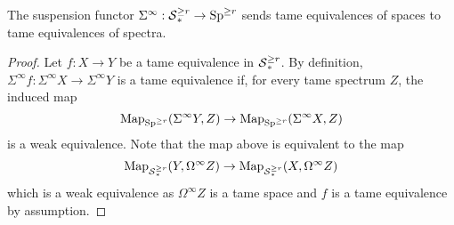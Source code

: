 \begin{lemma}
\label{Suspension preserves tame equivalence}
	The suspension functor $\Sigma^{\infty}:\operatorname{\mathcal{S}}^{\geq r}_{*} \to \operatorname{Sp}^{\geq r}$ sends tame equivalences of spaces to tame equivalences of spectra.
\end{lemma}
\begin{proof}
	Let $f:X\to Y$ be a tame equivalence in $\operatorname{\mathcal{S}}^{\geq r}_{*}$. By definition, $\Sigma^{\infty}f: \Sigma^{\infty}X \to \Sigma^{\infty}Y$ is a tame equivalence if, for every tame spectrum $Z$, the induced map
	$$
	\operatorname{Map}_{\operatorname{Sp}^{\geq r}}(\Sigma^{\infty} Y, Z) \to 	\operatorname{Map}_{\operatorname{Sp}^{\geq r}}(\Sigma^{\infty} X, Z)
	$$
	is a weak equivalence. Note that the map above is equivalent to the map
	$$
	\operatorname{Map}_{\operatorname{\mathcal{S}}^{\geq r}_{*}}(Y, \Omega^{\infty} Z) \to 	\operatorname{Map}_{\operatorname{\mathcal{S}}^{\geq r}_{*}}(X, \Omega^{\infty} Z)
	$$
	which is a weak equivalence as $\Omega^{\infty}Z$ is a tame space and $f$ is a tame equivalence by assumption.
\end{proof}





	

